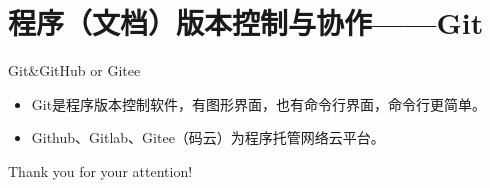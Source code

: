 \documentclass[xcolor=x11names,compress,10pt]{ctexbeamer}
\begin{document}
\section[Git]{程序（文档）版本控制与协作——Git}
\begin{frame}{Git\&GitHub or Gitee}
\begin{itemize}
\item Git是程序版本控制软件，有图形界面，也有命令行界面，命令行更简单。
\item Github、Gitlab、Gitee（码云）为程序托管网络云平台。
\end{itemize}
\end{frame}




\begin{frame}

{\huge Thank you for your attention!}

\end{frame}





\end{document}
